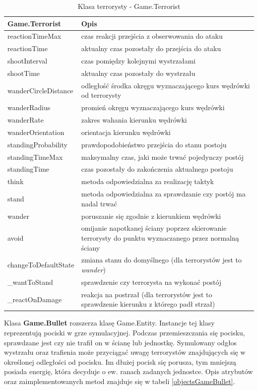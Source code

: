 \begin{table}
\begin{center}
\begin{tabular}{|p{}|p{}|}
\hline
\textbf{Game.Terrorist} & Opis\\\hline		
	reactionTimeMax & czas reakcji przejścia  z obserwowania do ataku\\
	reactionTime & aktualny czas pozostały do przejścia do ataku\\
	shootInterval & czas pomiędzy kolejnymi wystrzałami\\
	shootTime & aktualny czas pozostały do wystrzału\\
	wanderCircleDistance & odległość środka okręgu wyznaczającego kurs wędrówki od terrorysty\\
	wanderRadius & promień okręgu wyznaczającego kurs wędrówki\\
	wanderRate & zakres wahania kierunku wędrówki\\
	wanderOrientation & orientacja kierunku wędrówki\\
	standingProbability & prawdopodobieństwo przejścia do stanu postoju\\
	standingTimeMax & maksymalny czas, jaki może trwać pojedynczy postój\\
	standingTime & czas pozostały do zakończenia aktualnego postoju
\\\hline
	think & metoda odpowiedzialna za realizację taktyk\\
	stand & metoda odpowiedzialna za sprawdzanie czy postój ma nadal trwać\\
	wander & poruszanie się zgodnie z kierunkiem wędrówki\\
	avoid & omijanie napotkanej ściany poprzez skierowanie terrorysty do punktu wyznaczanego przez normalną ściany\\
	changeToDefaultState & zmiana stanu do domyślnego (dla terrorystów jest to \emph{wander})\\
	\_wantToStand & sprawdzenie czy terrorysta na wykonać postój\\
	\_reactOnDamage & reakcja na postrzał (dla terrorystów jest to sprawdzenie kierunku z którego padł strzał)
\\\hline
\end{tabular}
\caption {Klasa terrorysty - Game.Terrorist\label{objectsGameTerrorist}}
\end{center}
\end{table} 

Klasa \textbf{Game.Bullet} rozszerza klasę Game.Entity. Instancje tej klasy reprezentują pociski w grze symulacyjnej. Podczas przemieszczania się pocisku, sprawdzane jest czy nie trafił on w ścianę lub jednostkę. Symulowany odgłos wystrzału oraz trafienia może przyciągać uwagę terrorystów znajdujących się w określonej odległości od pocisku. Im dłużej pocisk się porusza, tym mniejszą posiada energię, która decyduje o ew. ranach zadanych jednostce. Opis atrybutów oraz zaimplementowanych metod znajduje się w tabeli \ref{objectsGameBullet}. 

